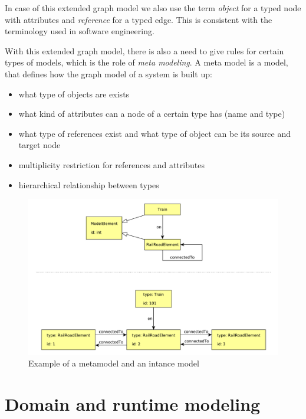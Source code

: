 In case of this extended graph model we also use the term \emph{object} for a typed node with attributes and \emph{reference} for a typed edge. This is consistent with the terminology used in software engineering.

With this extended graph model, there is also a need to give rules for certain types of models, which is the role of \emph{meta modeling}.
A meta model is a model, that defines how the graph model of a system is built up:
\begin{itemize}
	\item what type of objects are exists
	\item what kind of attributes can a node of a certain type has (name and type)
	\item what type of references exist and what type of object can be its source and target node
	\item multiplicity restriction for references and attributes
	\item hierarchical relationship between types
\end{itemize}


\begin{figure}[h]
	\begin{center}
		\includegraphics[width=\textwidth]{figures/metamodel.pdf}
		\caption{ Example of a metamodel and an intance model }
		\label{fig:metamodel}
	\end{center}
\end{figure}

\pagebreak

\section{Domain and runtime modeling}

